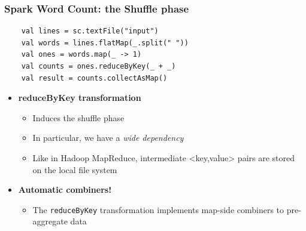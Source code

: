 \begin{frame}[fragile] 
\frametitle{Spark Word Count: the Shuffle phase}
\begin{lstlisting}
	val lines = sc.textFile("input")
	val words = lines.flatMap(_.split(" ")) 
	val ones = words.map(_ -> 1)
	val counts = ones.reduceByKey(_ + _) 
	val result = counts.collectAsMap()
\end{lstlisting}

\begin{itemize}
	\item {\bf reduceByKey transformation}
	\begin{itemize}
		\item Induces the shuffle phase
		\item In particular, we have a \emph{wide dependency}
		\item Like in Hadoop MapReduce, intermediate <key,value> pairs are stored on the local file system
	\end{itemize}

	\vspace{10pt}

	\item {\bf Automatic combiners!}
	\begin{itemize}
		\item The \texttt{reduceByKey} transformation implements map-side combiners to pre-aggregate data
	\end{itemize}
\end{itemize}

\end{frame}
